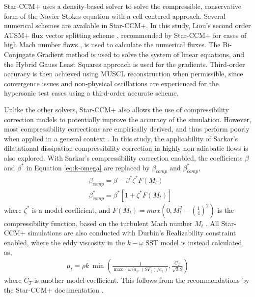 \documentclass[journal ]{new-aiaa}
\begin{document}
Star-CCM+ uses a density-based solver to solve the compressible, conservative form of the Navier Stokes equation with a cell-centered approach. %
Several numerical schemes are available in Star-CCM+. In this study,  Liou’s second order AUSM+ flux vector splitting scheme \cite{Liou1996}, recommended by Star-CCM+ for cases of high Mach number flows \cite{SiemensPLM}, is used to calculate the numerical fluxes. The Bi-Conjugate Gradient method is used to solve the system of linear equations, and the Hybrid Gauss Least Squares approach is used for the  gradients. Third-order accuracy is then achieved using MUSCL reconstruction when permissible, since convergence issues and non-physical oscillations are experienced for the hypersonic test cases using a third-order accurate scheme.

Unlike the other solvers, Star-CCM+ also allows the use of compressibility correction models to potentially improve the accuracy of the simulation. 
However, most compressibility corrections are empirically derived, and thus perform poorly when applied in a general context \cite{Rumsey2009}.
In this study, the applicability of Sarkar's dilatational dissipation compressibility correction \cite{Sarkar1991} in highly non-adiabatic flows is also explored. With Sarkar's compressibility correction enabled, the coefficients $\beta$ and $\beta^*$ in Equation \eqref{eq:k-omega} are replaced by $\beta_{comp}$ and $\beta^*_{comp}$,
\begin{align}
    &\beta_{comp} = \beta - \beta^* \zeta^* F(M_t) \label{eq:comp_corr_1}\\
    &\beta^*_{comp} = \beta^* \left[1 + \zeta^* F(M_t)\right] \label{eq:comp_corr_2}
\end{align}
where $\zeta^*$ is a model coefficient, and $F(M_t) = max \left(0, M_t^2 - \left(\frac{1}{4}\right)^2 \right)$ is the compressibility function, based on the turbulent Mach number $M_t$ \cite{SiemensPLM}. All Star-CCM+ simulations are also conducted with Durbin's Realizability constraint enabled, where the eddy viscosity in the $k-\omega$ SST model is instead calculated as,
\begin{align}
\mu_t = \rho k \: \min \left( \frac{1}{\max \left(\omega / a_1 , (S F_2) / a_1 \right)}, \frac{C_T}{\sqrt{3} S} \right)
\end{align}
where $C_T$ is another model coefficient. This follows from the recommendations by the Star-CCM+ documentation \cite{SiemensPLM}. 
\end{document}
